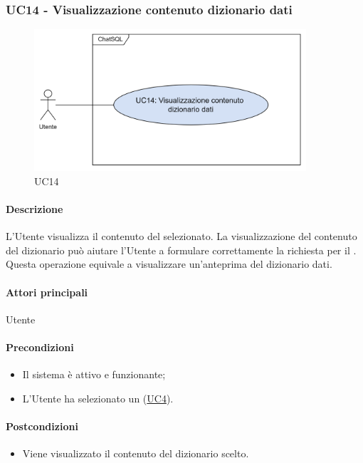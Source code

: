 \subsubsection{UC14 - Visualizzazione contenuto dizionario dati}\label{UC14}

\begin{figure}[H]
  \centering
  \includegraphics[width=0.90\textwidth]{assets/uc14.png}
  \caption{UC14}
\end{figure}

\paragraph*{Descrizione}
L'Utente visualizza il contenuto del  selezionato. La visualizzazione del contenuto del dizionario può aiutare l'Utente a formulare correttamente la richiesta per il . Questa operazione equivale a visualizzare un'anteprima del dizionario dati.

\paragraph*{Attori principali}
Utente

\paragraph*{Precondizioni}
\begin{itemize}
  \item Il sistema è attivo e funzionante;
  \item L'Utente ha selezionato un  (\hyperref[UC4]{UC4}).
\end{itemize}

\paragraph*{Postcondizioni}
\begin{itemize}
  \item Viene visualizzato il contenuto del dizionario scelto.
\end{itemize}

